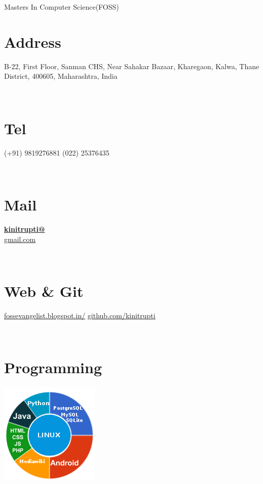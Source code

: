 \documentclass[]{friggeri-cv}
\begin{document}
      {Masters In Computer Science(FOSS)}
      

\begin{aside}
  \section{Address}
    B-22, First Floor, Sanman CHS, Near Sahakar Bazaar, Kharegaon, Kalwa, Thane District, 400605, Maharashtra, India

    ~
  \section{Tel}
    (+91) 9819276881
    (022) 25376435


        ~
  \section{Mail}
    \href{kinitrupti@gmail.com}{\textbf{kinitrupti@}\\gmail.com}
   
    ~
  \section{Web \& Git}
    \href{http://fossevangelist.blogspot.in/}{fossevangelist.blogspot.in/}
    \href{https://github.com/kinitrupti}{github.com/kinitrupti}
 
    ~
  \section{Programming}
    \includegraphics[scale=0.62]{img/programming.png}
    ~

\end{aside}
\end{document}
